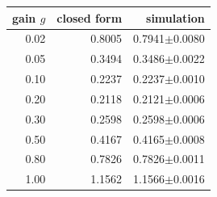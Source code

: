\begin{tabular}{rrr}
\toprule
gain $g$ & closed form & simulation \\
\midrule
0.02 & 0.8005 & 0.7941$\pm$0.0080 \\
0.05 & 0.3494 & 0.3486$\pm$0.0022 \\
0.10 & 0.2237 & 0.2237$\pm$0.0010 \\
0.20 & 0.2118 & 0.2121$\pm$0.0006 \\
0.30 & 0.2598 & 0.2598$\pm$0.0006 \\
0.50 & 0.4167 & 0.4165$\pm$0.0008 \\
0.80 & 0.7826 & 0.7826$\pm$0.0011 \\
1.00 & 1.1562 & 1.1566$\pm$0.0016 \\
\bottomrule
\end{tabular}
